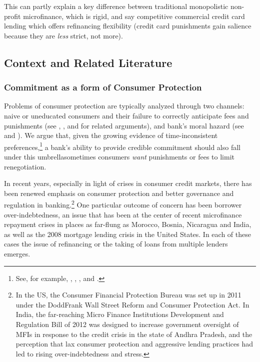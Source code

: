\documentclass[11pt,english]{article}
\theoremstyle{plain}
\theoremstyle{definition}
\begin{document}
This can partly explain a key difference between traditional monopolistic
non-profit microfinance, which is rigid, and say competitive commercial
credit card lending which offers refinancing flexibility (credit card
punishments gain salience because they are\textit{ less} strict, not
more).

\subsection{Context and Related Literature}

\subsubsection{Commitment as a form of Consumer Protection}

Problems of consumer protection are typically analyzed through two
channels: naive or uneducated consumers and their failure to correctly
anticipate fees and punishments (see \citet{gabaix_shrouded_2006},
\citet{armstrong2012}, and \citet{akerlof2015}
for related arguments), and bank's moral hazard (see \citet{dewatripont1999}
and \citet{oak2010}). We argue that, given the growing evidence
of time-inconsistent preferences,\footnote{See, for example, \citet{laibson2003}, \citet{ashraf_tying_2006},
\citet{gugerty2007}, and \citet{tanaka2010}.} a bank's ability to provide credible commitment should also fall
under this umbrella\textendash sometimes consumers \textit{want} punishments
or fees to limit renegotiation.

In recent years, especially in light of crises in consumer credit
markets, there has been renewed emphasis on consumer protection and
better governance and regulation in banking.\footnote{In the US, the Consumer Financial Protection Bureau was set up in
2011 under the Dodd\textendash Frank Wall Street Reform and Consumer
Protection Act. In India, the far-reaching Micro Finance Institutions
Development and Regulation Bill of 2012 was designed to increase government
oversight of MFIs in response to the credit crisis in the state of
Andhra Pradesh, and the perception that lax consumer protection and
aggressive lending practices had led to rising over-indebtedness and
stress.} One particular outcome of concern has been borrower over-indebtedness,
an issue that has been at the center of recent microfinance repayment
crises in places as far-flung as Morocco, Bosnia, Nicaragua and India,
as well as the 2008 mortgage lending crisis in the United States.
In each of these cases the issue of refinancing or the taking of loans
from multiple lenders emerges.
\end{document}
